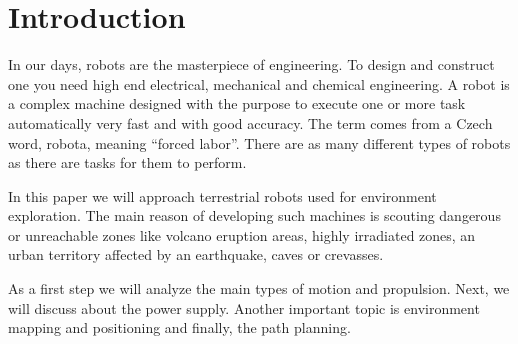 \documentclass{romjist}
\begin{document}
\section{Introduction}
	In our days, robots are the masterpiece of engineering. To design and construct one you need high end electrical, mechanical and chemical engineering.
A robot is a complex machine designed with the purpose to execute one or more task automatically very fast and with good accuracy. The term comes from a Czech word, robota, meaning “forced labor”. There are as many different types of robots as there are tasks for them to perform.\par
	In this paper we will approach terrestrial robots used for environment exploration. The main reason of developing such machines is scouting dangerous or unreachable zones like volcano eruption areas, highly irradiated zones, an urban territory affected by an earthquake, caves or crevasses.\par
As a first step we will analyze the main types of motion and propulsion. Next, we will discuss about the power supply. Another important topic is environment mapping and positioning and finally, the path planning.
\end{document}
